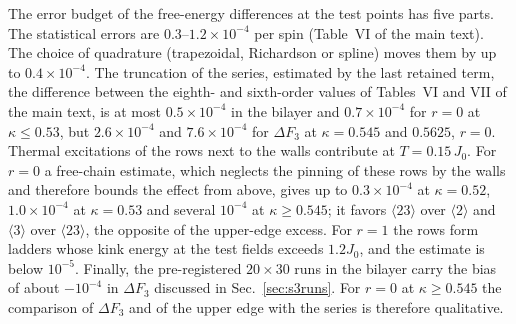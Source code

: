 \documentclass[aps,prb,twocolumn,superscriptaddress,floatfix]{revtex4-2}
\begin{document}
The error budget of the free-energy differences at the test points has five parts. The statistical errors are
$0.3$--$1.2\times10^{-4}$ per spin (Table~VI of the main text). The choice of quadrature (trapezoidal, Richardson or spline)
moves them by up to $0.4\times10^{-4}$. The truncation of the series, estimated by the last retained term, the
difference between the eighth- and sixth-order values of Tables~VI and VII of the main text, is at most
$0.5\times10^{-4}$ in the bilayer and $0.7\times10^{-4}$ for $r=0$ at $\kappa\le0.53$, but $2.6\times10^{-4}$ and
$7.6\times10^{-4}$ for $\Delta F_3$ at $\kappa=0.545$ and $0.5625$, $r=0$. Thermal excitations of the rows next to the
walls contribute at $T=0.15\,J_0$. For $r=0$ a free-chain estimate, which neglects the pinning of these rows by the walls
and therefore bounds the effect from above, gives up to $0.3\times10^{-4}$ at $\kappa=0.52$, $1.0\times10^{-4}$ at
$\kappa=0.53$ and several $10^{-4}$ at $\kappa\ge0.545$; it favors $\langle23\rangle$ over $\langle2\rangle$ and
$\langle3\rangle$ over $\langle23\rangle$, the opposite of the upper-edge excess. For $r=1$ the rows form ladders whose kink
energy at the test fields exceeds $1.2J_0$, and the estimate is below $10^{-5}$. Finally, the pre-registered $20\times30$ runs in the bilayer carry the
bias of about $-10^{-4}$ in $\Delta F_3$ discussed in Sec.~\ref{sec:s3runs}. For $r=0$ at $\kappa\ge0.545$ the comparison of $\Delta F_3$ and of the upper
edge with the series is therefore qualitative.
\end{document}
